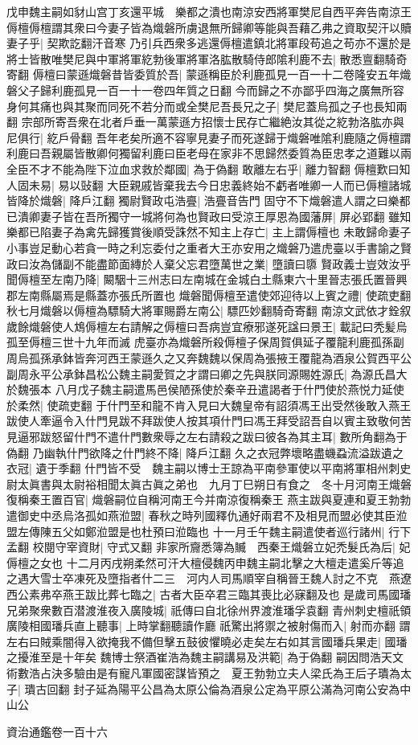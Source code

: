 戊申魏主嗣如豺山宫丁亥還平城　樂都之潰也南涼安西將軍樊尼自西平奔告南涼王傉檀傉檀謂其衆曰今妻子皆為熾磐所虜退無所歸卿等能與吾藉乙弗之資取契汗以贖妻子乎|{
	契欺訖翻汗音寒}
乃引兵西衆多逃還傉檀遣鎮北將軍段苟追之苟亦不還於是將士皆散唯樊尼與中軍將軍紇勃後軍將軍洛肱散騎侍郎隂利鹿不去|{
	散悉亶翻騎奇寄翻}
傉檀曰蒙遜熾磐昔皆委質於吾|{
	蒙遜稱臣於利鹿孤見一百一十二卷隆安五年熾磐父子歸利鹿孤見一百一十一卷四年質之日翻}
今而歸之不亦鄙乎四海之廣無所容身何其痛也與其聚而同死不若分而或全樊尼吾長兄之子|{
	樊尼蓋烏孤之子也長知兩翻}
宗部所寄吾衆在北者戶垂一萬蒙遜方招懷士民存亡繼絶汝其從之紇勃洛肱亦與尼俱行|{
	紇戶骨翻}
吾年老矣所適不容寧見妻子而死遂歸于熾磐唯隂利鹿隨之傉檀謂利鹿曰吾親屬皆散卿何獨留利鹿曰臣老母在家非不思歸然委質為臣忠孝之道難以兩全臣不才不能為陛下泣血求救於鄰國|{
	為于偽翻}
敢離左右乎|{
	離力智翻}
傉檀歎曰知人固未易|{
	易以䜴翻}
大臣親戚皆棄我去今日忠義終始不虧者唯卿一人而已傉檀諸城皆降於熾磐|{
	降戶江翻}
獨尉賢政屯浩亹|{
	浩亹音告門}
固守不下熾磐遣人謂之曰樂都已潰卿妻子皆在吾所獨守一城將何為也賢政曰受涼王厚恩為國藩屏|{
	屏必郢翻}
雖知樂都已陷妻子為禽先歸獲賞後順受誅然不知主上存亡|{
	主上謂傉檀也}
未敢歸命妻子小事豈足動心若貪一時之利忘委付之重者大王亦安用之熾磐乃遣虎臺以手書諭之賢政曰汝為儲副不能盡節面縳於人棄父忘君墮萬世之業|{
	墮讀曰隳}
賢政義士豈效汝乎聞傉檀至左南乃降|{
	闞駰十三州志曰左南城在金城白土縣東六十里晉志張氏置晉興郡左南縣屬焉是縣蓋亦張氏所置也}
熾磐聞傉檀至遣使郊迎待以上賓之禮|{
	使疏吏翻}
秋七月熾磐以傉檀為驃騎大將軍賜爵左南公|{
	驃匹妙翻騎奇寄翻}
南涼文武依才銓叙歲餘熾磐使人鴆傉檀左右請解之傉檀曰吾病豈宜療邪遂死諡曰景王|{
	載記曰秃髪烏孤至傉檀三世十九年而滅}
虎臺亦為熾磐所殺傉檀子保周賀俱延子覆龍利鹿孤孫副周烏孤孫承鉢皆奔河西王蒙遜久之又奔魏魏以保周為張掖王覆龍為酒泉公賀西平公副周永平公承鉢昌松公魏主嗣愛賀之才謂曰卿之先與朕同源賜姓源氏|{
	為源氏昌大於魏張本}
八月戊子魏主嗣遣馬邑侯陋孫使於秦辛丑遣謁者于什門使於燕悦力延使於柔然|{
	使疏吏翻}
于什門至和龍不肯入見曰大魏皇帝有詔須馮王出受然後敢入燕王跋使人牽逼令入什門見跋不拜跋使人按其項什門曰馮王拜受詔吾自以賓主致敬何苦見逼邪跋怒留什門不遣什門數衆辱之左右請殺之跋曰彼各為其主耳|{
	數所角翻為于偽翻}
乃幽執什門欲降之什門終不降|{
	降戶江翻}
久之衣冠弊壞略盡蟣蝨流溢跋遺之衣冠|{
	遺于季翻}
什門皆不受　魏主嗣以博士王諒為平南參軍使以平南將軍相州刺史尉太眞書與太尉裕相聞太眞古眞之弟也　九月丁巳朔日有食之　冬十月河南王熾磐復稱秦王置百官|{
	熾磐嗣位自稱河南王今并南涼復稱秦王}
燕主跋與夏連和夏王勃勃遣御史中丞烏洛孤如燕涖盟|{
	春秋之時列國釋仇通好兩君不及相見而盟必使其臣涖盟左傳陳五父如鄭涖盟是也杜預曰涖臨也}
十一月壬午魏主嗣遣使者巡行諸州|{
	行下孟翻}
校閱守宰資財|{
	守式又翻}
非家所齎悉簿為贓　西秦王熾磐立妃禿髮氏為后|{
	妃傉檀之女也}
十二月丙戌朔柔然可汗大檀侵魏丙申魏主嗣北擊之大檀走遣奚斤等追之遇大雪士卒凍死及墮指者什二三　河内人司馬順宰自稱晉王魏人討之不克　燕遼西公素弗卒燕王跋比葬七臨之|{
	古者大臣卒君三臨其喪比必寐翻及也}
是歲司馬國璠兄弟聚衆數百潜渡淮夜入廣陵城|{
	祇傳曰自北徐州界渡淮璠孚袁翻}
青州刺史檀祇領廣陵相國璠兵直上聽事|{
	上時掌翻聽讀作廳}
祇驚出將禦之被射傷而入|{
	射而亦翻}
謂左右曰賊乘闇得入欲掩我不備但擊五鼓彼懼曉必走矣左右如其言國璠兵果走|{
	國璠之擾淮至是十年矣}
魏博士祭酒崔浩為魏主嗣講易及洪範|{
	為于偽翻}
嗣因問浩天文術數浩占決多驗由是有寵凡軍國密謀皆預之　夏王勃勃立夫人梁氏為王后子璝為太子|{
	璝古回翻}
封子延為陽平公昌為太原公倫為酒泉公定為平原公滿為河南公安為中山公

資治通鑑卷一百十六
